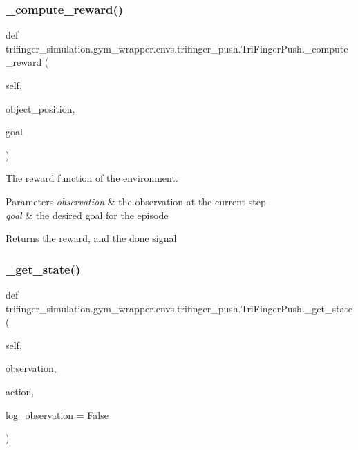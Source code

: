 \subsubsection{\texorpdfstring{\+\_\+compute\+\_\+reward()}{\_compute\_reward()}}
{\footnotesize\ttfamily def trifinger\+\_\+simulation.\+gym\+\_\+wrapper.\+envs.\+trifinger\+\_\+push.\+Tri\+Finger\+Push.\+\_\+compute\+\_\+reward (\begin{DoxyParamCaption}\item[{}]{self,  }\item[{}]{object\+\_\+position,  }\item[{}]{goal }\end{DoxyParamCaption})\hspace{0.3cm}{\ttfamily [private]}}



The reward function of the environment. 


\begin{DoxyParams}{Parameters}
{\em observation} & the observation at the current step \\
\hline
{\em goal} & the desired goal for the episode\\
\hline
\end{DoxyParams}
\begin{DoxyReturn}{Returns}
the reward, and the done signal 
\end{DoxyReturn}
\mbox{\label{classtrifinger__simulation_1_1gym__wrapper_1_1envs_1_1trifinger__push_1_1TriFingerPush_a1ca7fa96ffd63170bad1f341b734b388}} 
\subsubsection{\texorpdfstring{\+\_\+get\+\_\+state()}{\_get\_state()}}
{\footnotesize\ttfamily def trifinger\+\_\+simulation.\+gym\+\_\+wrapper.\+envs.\+trifinger\+\_\+push.\+Tri\+Finger\+Push.\+\_\+get\+\_\+state (\begin{DoxyParamCaption}\item[{}]{self,  }\item[{}]{observation,  }\item[{}]{action,  }\item[{}]{log\+\_\+observation = {\ttfamily False} }\end{DoxyParamCaption})\hspace{0.3cm}{\ttfamily [private]}}



